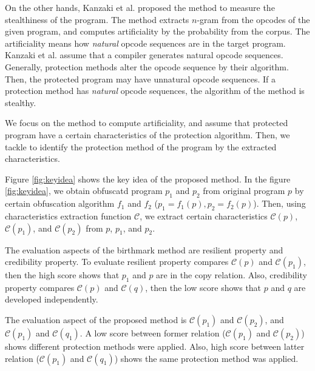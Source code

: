\documentclass[conference]{IEEEtran}
\newcommand{\birth}[1]{\mathcal{C}(#1)}
\begin{document}
On the other hands, Kanzaki et al. proposed the method to measure the
stealthiness of the program\cite{kanzaki14ipsj}. The method extracts
$n$-gram from the opcodes of the given program, and computes
artificiality by the probability from the corpus.  The artificiality
means how {\em natural} opcode sequences are in the target program.
Kanzaki et al. assume that a compiler generates natural opcode
sequences.  Generally, protection methods alter the opcode sequence by
their algorithm.  Then, the protected program may have unnatural
opcode sequences.  If a protection method has {\em natural} opcode
sequences, the algorithm of the method is stealthy.

We focus on the method to compute artificiality, and assume that
protected program have a certain characteristics of the protection
algorithm.  Then, we tackle to identify the protection method of the
program by the extracted characteristics.

Figure \ref{fig:keyidea} shows the key idea of the proposed method.
In the figure \ref{fig:keyidea}, we obtain obfuscatd program $p_1$
and $p_2$ from original program $p$ by certain obfuscation algorithm
$f_1$ and $f_2$ ($p_1 = f_1(p), p_2 = f_2(p)$).  Then, using
characteristics extraction function $\mathcal{C}$, we extract certain
characteristics $\birth{p}$, $\birth{p_1}$, and $\birth{p_2}$ from
$p$, $p_1$, and $p_2$.

The evaluation aspects of the birthmark method are resilient property
and credibility property.  To evaluate resilient property compares
$\birth{p}$ and $\birth{p_1}$, then the high score shows that $p_1$
and $p$ are in the copy relation.  Also, credibility property compares
$\birth{p}$ and $\birth{q}$, then the low score shows that $p$ and $q$
are developed independently.

The evaluation aspect of the proposed method is $\birth{p_1}$ and
$\birth{p_2}$, and $\birth{p_1}$ and $\birth{q_1}$.  A low score
between former relation ($\birth{p_1}$ and $\birth{p_2}$) shows
different protection methods were applied.  Also, high score between
latter relation ($\birth{p_1}$ and $\birth{q_1}$) shows the same
protection method was applied.
\end{document}
